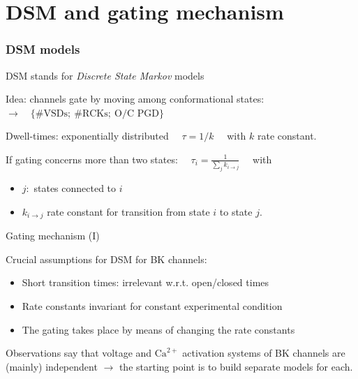 \documentclass{beamer}
\newcommand{\ca}{\text{Ca}^{2+}}
\begin{document}
\section{DSM and gating mechanism}
\begin{frame}\frametitle{DSM models}
    DSM stands for \emph{Discrete State Markov} models

    Idea: channels gate by moving among conformational states: $\rightarrow \quad\{\# \text{VSDs};\ \# \text{RCKs};\ \text{O/C PGD}\}$
    \bigskip

    Dwell-times: exponentially distributed $\quad \tau = 1/k \quad$ with $k$ rate constant.

    If gating concerns more than two states: $\quad \tau_i = \frac{1}{\sum_{j} k_{i\rightarrow j}} \quad$
    with 
    \begin{itemize}
    	\item $j:$ states connected to $i$
    	\item $k_{i\rightarrow j}$ rate constant for transition from state $i$ to state $j.$
    \end{itemize}

    


\end{frame}

\begin{frame}{Gating mechanism (I)}


 Crucial assumptions for DSM for BK channels:
	\begin{itemize}
    	\item Short transition times: irrelevant w.r.t. open/closed times
    	\item Rate constants invariant for constant experimental condition
    	\item The gating takes place by means of changing the rate constants
    \end{itemize}


Observations say that voltage and $\ca$ activation systems of BK channels are (mainly) independent $\rightarrow$ the starting point is to build separate models for each.
\end{frame}
\end{document}
